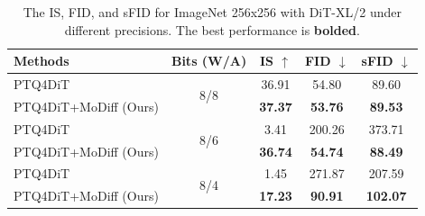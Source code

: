 \begin{table}[h!]
\centering
\caption{The IS, FID, and sFID for ImageNet 256x256 with DiT-XL/2 under different precisions. The best performance is \textbf{bolded}.}
\begin{tabular}{l|c|c|c|c}
\toprule
{Methods} & {Bits (W/A)} & IS $\uparrow$ & FID $\downarrow$ & sFID $\downarrow$ \\
\midrule
PTQ4DiT & \multirow{2}{*}{8/8} & 36.91 & 54.80 & 89.60 \\
PTQ4DiT+MoDiff (Ours) & & \bf 37.37 & \bf 53.76 & \bf 89.53 \\
\midrule
PTQ4DiT & \multirow{2}{*}{8/6} & 3.41 & 200.26 & 373.71 \\
PTQ4DiT+MoDiff (Ours) & & \bf 36.74 & \bf 54.74 & \bf 88.49 \\
\midrule
PTQ4DiT & \multirow{2}{*}{8/4} & 1.45 & 271.87 & 207.59 \\
PTQ4DiT+MoDiff (Ours) & & \bf 17.23 & \bf 90.91 & \bf 102.07 \\
\bottomrule
\end{tabular}
\label{tab:DiT}
\end{table}
